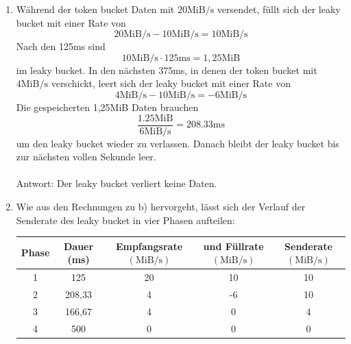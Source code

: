 \documentclass[a4paper,
			llpt,
			solution,
			accentcolor=tud2d,
			colorbacktitle
			]
			{tudexercise}
\newcommand{\MiBs}{\mathrm{MiB}/\mathrm{s}}
\begin{document}
\begin{enumerate}
\begin{multicols}{2}
\end{multicols}
\newpage
\item
Während der token bucket Daten mit $20\MiBs$ versendet, füllt sich der leaky bucket mit einer Rate von
$$
20 \MiBs - 10\MiBs = 10\MiBs
$$
Nach den 125ms sind
$$
10\MiBs  \cdot 125\mathrm{ms} = 1,25 \mathrm{MiB}
$$ im leaky bucket.
In den nächsten 375ms, in denen der token bucket mit $4\MiBs$ verschickt, leert sich der leaky bucket mit einer Rate von
$$
4\MiBs - 10\MiBs = -6 \MiBs
$$
Die gespeicherten 1,25MiB Daten brauchen
$$
\frac{1.25\mathrm{MiB}}{6\MiBs} = 208.33\mathrm{ms}
$$
um den leaky bucket wieder zu verlassen.
Danach bleibt der leaky bucket bis zur nächsten vollen Sekunde leer.
\\\\
Antwort: Der leaky bucket verliert keine Daten.
\item

Wie aus den Rechnungen zu b) hervorgeht, lässt sich der Verlauf der Senderate des leaky bucket in vier Phasen aufteilen:
\begin{center}
\begin{tabular}{|c|c|c|c|c|}
\hline
Phase
&
Dauer (ms)
&
Empfangsrate $\left( \MiBs \right)$
&
und Füllrate $\left( \MiBs \right)$
&
Senderate $\left( \MiBs \right)$
\\ \hline
1 & 125    & 20 & 10 & 10 \\ \hline
2 & 208,33 &  4 & -6 & 10 \\ \hline
3 & 166,67 &  4 &  0 &  4 \\ \hline
4 & 500    &  0 &  0 &  0 \\ \hline
\end{tabular}
\end{center}
\begin{center}
\end{center}
\end{enumerate}
\end{document}
